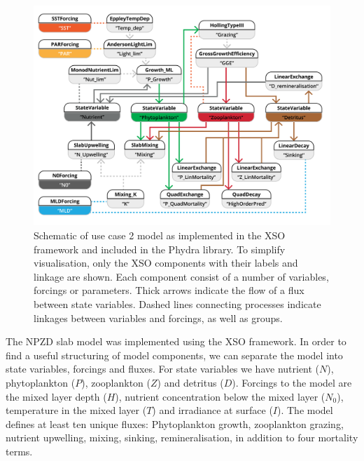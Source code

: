 \documentclass[journal abbreviation, manuscript]{copernicus}
\begin{document}
\begin{figure}[t]
\includegraphics[width=15cm]{Figures/firstdraft_schematics/code_schematics/EMPOWER.pdf}
\caption{Schematic of use case 2 model as implemented in the XSO framework and included in the Phydra library. To simplify visualisation, only the XSO components with their labels and linkage are shown. Each component consist of a number of variables, forcings or parameters. Thick arrows indicate the flow of a flux between state variables. Dashed lines connecting processes indicate linkages between variables and forcings, as well as groups.}
\label{Figure:CodeSchematics_2}
\end{figure}

The NPZD slab model was implemented using the XSO framework. In order to find a useful structuring of model components, we can separate the model into state variables, forcings and fluxes. For state variables we have nutrient ($N$), phytoplankton ($P$), zooplankton ($Z$) and detritus ($D$). Forcings to the model are the mixed layer depth ($H$), nutrient concentration below the mixed layer ($N_0$), temperature in the mixed layer ($T$) and irradiance at surface ($I$). The model defines at least ten unique fluxes: Phytoplankton growth, zooplankton grazing, nutrient upwelling, mixing, sinking, remineralisation, in addition to four mortality terms.
\end{document}
